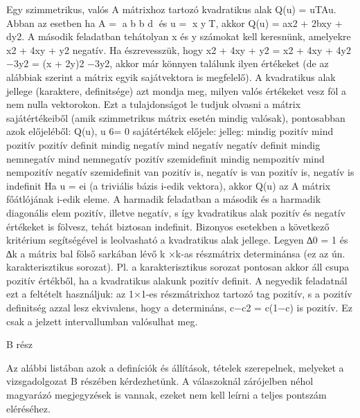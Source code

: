 \begin{frame}
  \begin{tcolorbox}[title={12/4. -N-}]
     Egy szimmetrikus, valós A mátrixhoz tartozó kvadratikus alak Q(u) = uTAu. Abban az esetben ha A = a b b d és u = x yT, akkor Q(u) = ax2 + 2bxy + dy2. A második feladatban tehátolyan x és y számokat kell keresnünk, amelyekre x2 + 4xy + y2 negatív. Ha észrevesszük, hogy x2 + 4xy + y2 = x2 + 4xy + 4y2 −3y2 = (x + 2y)2 −3y2, akkor már könnyen találunk ilyen értékeket (de az alábbiak szerint a mátrix egyik sajátvektora is megfelelő). A kvadratikus alak jellege (karaktere, deﬁnitsége) azt mondja meg, milyen valós értékeket vesz föl a nem nulla vektorokon. Ezt a tulajdonságot le tudjuk olvasni a mátrix sajátértékeiből (amik szimmetrikus mátrix esetén mindig valósak), pontosabban azok előjeléből: Q(u), u 6= 0 sajátértékek előjele: jelleg: mindig pozitív mind pozitív pozitív deﬁnit mindig negatív mind negatív negatív deﬁnit mindig nemnegatív mind nemnegatív pozitív szemideﬁnit mindig nempozitív mind nempozitív negatív szemideﬁnit van pozitív is, negatív is van pozitív is, negatív is indeﬁnit Ha u = ei (a triviális bázis i-edik vektora), akkor Q(u) az A mátrix főátlójának i-edik eleme. A harmadik feladatban a második és a harmadik diagonális elem pozitív, illetve negatív, s így kvadratikus alak pozitív és negatív értékeket is fölvesz, tehát biztosan indeﬁnit. Bizonyos esetekben a következő kritérium segítségével is leolvasható a kvadratikus alak jellege. Legyen ∆0 = 1 és ∆k a mátrix bal fölső sarkában lévő k ×k-as részmátrix determinánsa (ez az ún. karakterisztikus sorozat). Pl. a karakterisztikus sorozat pontosan akkor áll csupa pozitív értékből, ha a kvadratikus alakunk pozitív deﬁnit. A negyedik feladatnál ezt a feltételt használjuk: az 1×1-es részmátrixhoz tartozó tag pozitív, s a pozitív deﬁnitség azzal lesz ekvivalens, hogy a determináns, c−c2 = c(1−c) is pozitív. Ez csak a jelzett intervallumban valósulhat meg.
  \end{tcolorbox}
\end{frame}


\begin{frame}[plain]
\begin{tcolorbox}[center, colback={myyellow}, coltext={black}, colframe={myyellow}]
    {\RHuge  B rész}
    \mmedskip
\end{tcolorbox}
\end{frame}


\begin{frame}
  \begin{tcolorbox}[title={12/4. -N-}]
     Az alábbi listában azok a deﬁníciók és állítások, tételek szerepelnek, melyeket a vizsgadolgozat B részében kérdezhetünk. A válaszoknál zárójelben néhol magyarázó megjegyzések is vannak, ezeket nem kell leírni a teljes pontszám eléréséhez.
  \end{tcolorbox}
\end{frame}

